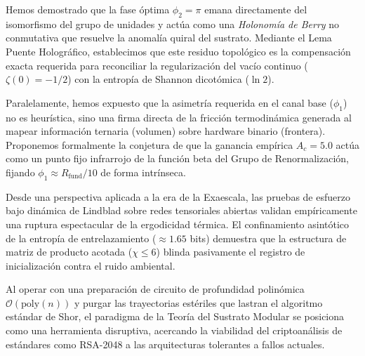 \documentclass[12pt,a4paper]{article}
\theoremstyle{plain}
\theoremstyle{definition}
\theoremstyle{remark}
\begin{document}
Hemos demostrado que la fase óptima $\phi_2 = \pi$ emana directamente del isomorfismo del grupo de unidades y actúa como una \textit{Holonomía de Berry} no conmutativa que resuelve la anomalía quiral del sustrato. Mediante el Lema Puente Holográfico, establecimos que este residuo topológico es la compensación exacta requerida para reconciliar la regularización del vacío continuo ($\zeta(0) = -1/2$) con la entropía de Shannon dicotómica ($\ln 2$). 

Paralelamente, hemos expuesto que la asimetría requerida en el canal base ($\phi_1$) no es heurística, sino una firma directa de la fricción termodinámica generada al mapear información ternaria (volumen) sobre hardware binario (frontera). Proponemos formalmente la conjetura de que la ganancia empírica $A_c=5.0$ actúa como un punto fijo infrarrojo de la función beta del Grupo de Renormalización, fijando $\phi_1 \approx R_{\text{fund}}/10$ de forma intrínseca.

Desde una perspectiva aplicada a la era de la Exaescala, las pruebas de esfuerzo bajo dinámica de Lindblad sobre redes tensoriales abiertas validan empíricamente una ruptura espectacular de la ergodicidad térmica. El confinamiento asintótico de la entropía de entrelazamiento ($\approx 1.65$ bits) demuestra que la estructura de matriz de producto acotada ($\chi \le 6$) blinda pasivamente el registro de inicialización contra el ruido ambiental.

Al operar con una preparación de circuito de profundidad polinómica $\mathcal{O}(\text{poly}(n))$ y purgar las trayectorias estériles que lastran el algoritmo estándar de Shor, el paradigma de la Teoría del Sustrato Modular se posiciona como una herramienta disruptiva, acercando la viabilidad del criptoanálisis de estándares como RSA-2048 a las arquitecturas tolerantes a fallos actuales.
\end{document}
